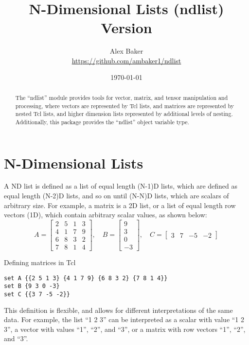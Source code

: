 \documentclass{article}
\title{\Huge{N-Dimensional Lists (ndlist)}\\\large Version \version}
\author{Alex Baker\\\small\url{https://github.com/ambaker1/ndlist}}
\date{\small\today}
\begin{document}
\maketitle
\begin{abstract}
\begin{center}
The ``ndlist'' module provides tools for vector, matrix, and tensor manipulation and processing, where vectors are represented by Tcl lists, and matrices are represented by nested Tcl lists, and higher dimension lists represented by additional levels of nesting. 
Additionally, this package provides the ``ndlist'' object variable type.
\end{center}
\end{abstract}
\clearpage
\section{N-Dimensional Lists}
A ND list is defined as a list of equal length (N-1)D lists, which are defined as equal length (N-2)D lists, and so on until (N-N)D lists, which are scalars of arbitrary size.
For example, a matrix is a 2D list, or a list of equal length row vectors (1D), which contain arbitrary scalar values, as shown below:
\begin{equation*}\label{eq:matrix_AB}
A=\begin{bmatrix}
2 & 5 & 1 & 3 \\
4 & 1 & 7 & 9 \\
6 & 8 & 3 & 2 \\
7 & 8 & 1 & 4
\end{bmatrix},\quad
B=\begin{bmatrix}
9 \\ 3 \\ 0 \\ -3
\end{bmatrix},\quad
C = \begin{bmatrix}
3 & 7 & -5 & -2
\end{bmatrix}
\end{equation*}
\begin{example}[label=ex:matrix_AB]{Defining matrices in Tcl}
\begin{lstlisting}
set A {{2 5 1 3} {4 1 7 9} {6 8 3 2} {7 8 1 4}}
set B {9 3 0 -3}
set C {{3 7 -5 -2}}
\end{lstlisting}
\end{example}

This definition is flexible, and allows for different interpretations of the same data. For example, the list ``1 2 3'' can be interpreted as a scalar with value ``1 2 3'', a vector with values ``1'', ``2'', and ``3'', or a matrix with row vectors ``1'', ``2'', and ``3''.
\end{document}
